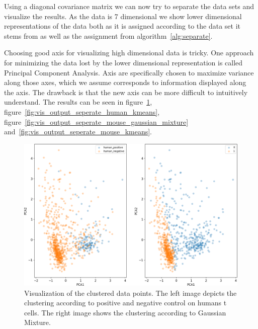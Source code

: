 Using a diagonal covariance matrix we can now try to separate the data sets and visualize the results. As the data is 7 dimensional we show lower dimensional representations of the data both as it is assigned according to the data set it stems from as well as the assignment from algorithm~\ref{alg:separate}.

Choosing good axis for visualizing high dimensional data is tricky. One approach for minimizing the data lost by the lower dimensional representation is called Principal Component Analysis. Axis are specifically chosen to maximize variance along those axes, which we assume corresponds to information displayed along the axis. The drawback is that the new axis can be more difficult to intuitively understand. The results can be seen in figure~\ref{fig:vis_output_seperate_human_gaussian_mixture}, figure~\ref{fig:vis_output_seperate_human_kmeans}, figure~\ref{fig:vis_output_seperate_mouse_gaussian_mixture} and~\ref{fig:vis_output_seperate_mouse_kmeans}.

\begin{figure}
	\centering
	\includegraphics[width=\textwidth]{fig/separate_human_gaussian_mixture}
	
	\caption{Visualization of the clustered data points. The left image depicts the clustering according to positive and negative control on humans t cells. The right image shows the clustering according to Gaussian Mixture.}
	\label{fig:vis_output_seperate_human_gaussian_mixture}
\end{figure}
	

